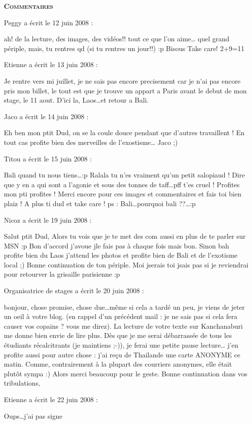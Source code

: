 \bigskip
\textbf{\textsc{Commentaires}}

\medskip
Peggy a écrit le 12 juin 2008 :
\begin{displayquote}
ah! de la lecture, des images, des vidéos!! tout ce que l'on aime\dots
quel grand périple, mais, tu rentres qd (si tu rentres un jour!!) :p
Bisous
Take care!
2+9=11
\end{displayquote}

\medskip
Etienne a écrit le 13 juin 2008 :
\begin{displayquote}
Je rentre vers mi juillet, je ne sais pas encore precisement car je n'ai pas encore pris mon billet, le tout est que je trouve un appart a Paris avant le debut de mon stage, le 11 aout.
D'ici la, Laos\dots et retour a Bali.
\end{displayquote}

\medskip
Jaco a écrit le 14 juin 2008 :
\begin{displayquote}
Eh ben mon ptit Dud, on se la coule douce pendant que d'autres travaillent !
En tout cas profite bien des merveilles de l'exostisme\dots
Jaco ;)
\end{displayquote}

\medskip
Titou a écrit le 15 juin 2008 :
\begin{displayquote}
Bali quand tu nous tiens\dots :p
Ralala tu n'es vraiment qu'un petit salopiaud ! Dire que y en a qui sont a l'agonie et sous des tonnes de taff\dots pff t'es cruel !
Profites mon pti profites !
Merci encore pour ces images et commentaires et fais toi bien plaiz !
A plus ti dud et take care !
ps : Bali\dots pourquoi bali ??\dots :p
\end{displayquote}

\medskip
Nicoz a écrit le 19 juin 2008 :
\begin{displayquote}
Salut ptit Dud,
Alors tu vois que je te met des com aussi en plus de te parler sur MSN :p
Bon d'accord j'avoue jle fais pas à chaque fois mais bon.
Sinon bah profite bien du Laos j'attend les photos et profite bien de Bali et de l'exotisme local ;)
Bonne continuation de ton périple.
Moi jserais toi jsais pas si je reviendrai pour retourver la grisaille parisienne :p
\end{displayquote}

\medskip
Organisatrice de stages a écrit le 20 juin 2008 :
\begin{displayquote}
bonjour,
chose promise, chose due\dots même si cela a tardé un peu, je viens de jeter un oeil à votre blog. (en rappel d'un précédent mail : je ne sais pas si cela fera causer vos copains ? vous me direz).
La lecture de votre texte sur Kanchanaburi me donne bien envie de lire plus. Dès que je me serai débarrassée de tous les étudiants récalcitrants (je maintiens ;-)), je ferai une petite pause lecture\dots
j'en profite aussi pour autre chose : j'ai reçu de Thailande une carte ANONYME ce matin. Comme, contrairement à la plupart des courriers anonymes, elle était plutôt sympa :) Alors merci beaucoup pour le geste.
Bonne continuation dans vos tribulations,
\end{displayquote}

\medskip
Etienne a écrit le 22 juin 2008 :
\begin{displayquote}
Oups\dots j'ai pas signe
\end{displayquote}

\vfill
